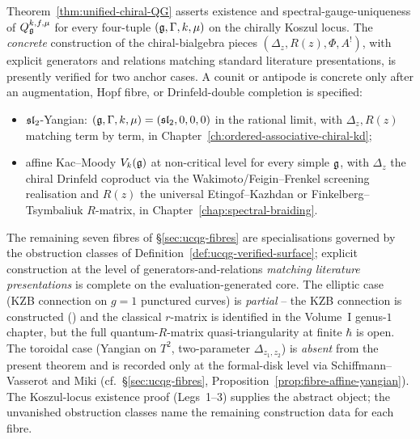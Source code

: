 \begin{remark}
\label{rem:concrete-vs-abstract-scope}
Theorem~\ref{thm:unified-chiral-QG} asserts existence and
spectral-gauge-uniqueness of $Q_{\mathfrak{g}}^{k,f,\mu}$ for every
four-tuple $(\mathfrak{g},\Gamma,k,\mu)$ on the chirally Koszul locus. The
\emph{concrete} construction of the chiral-bialgebra pieces
$(\Delta_z, R(z), \Phi, A^{!})$, with explicit generators and
relations matching standard literature presentations, is presently
verified for two anchor cases. A counit or antipode is concrete only
after an augmentation, Hopf fibre, or Drinfeld-double completion is
specified:
\begin{itemize}
\item[(i)] $\mathfrak{sl}_2$-Yangian: $(\mathfrak{g},\Gamma,k,\mu) = (\mathfrak{sl}_2, 0, 0, 0)$
 in the rational limit, with $\Delta_z, R(z)$ matching
 \cite{Drinfeld85, Molev07, KhoroshkinTolstoy96} term by term, in
 Chapter~\ref{ch:ordered-associative-chiral-kd};
\item[(ii)] affine Kac--Moody $V_k(\mathfrak{g})$ at non-critical level for
 every simple $\mathfrak{g}$, with $\Delta_z$ the chiral Drinfeld coproduct
 via the Wakimoto/Feigin--Frenkel screening realisation and $R(z)$
 the universal Etingof--Kazhdan or Finkelberg--Tsymbaliuk $R$-matrix,
 in Chapter~\ref{chap:spectral-braiding}.
\end{itemize}
The remaining seven fibres of \S\ref{sec:ucqg-fibres} are
specialisations governed by the obstruction classes of
Definition~\ref{def:ucqg-verified-surface}; explicit construction at
the level of generators-and-relations \emph{matching literature
presentations} is complete on the evaluation-generated core. The
elliptic case (KZB connection on
$g=1$ punctured curves) is \emph{partial} -- the KZB connection is
constructed (\cite{Bernard88, Felder94}) and the classical $r$-matrix
is identified in the Volume~I genus-$1$ chapter, but the full
quantum-$R$-matrix quasi-triangularity at finite $\hbar$ is open. The
toroidal case (Yangian on $T^{2}$, two-parameter $\Delta_{z_1, z_2}$)
is \emph{absent} from the present theorem and is recorded only at the
formal-disk level via Schiffmann--Vasserot \cite{SchiffmannVasserot13}
and Miki \cite{Miki07} (cf.\ \S\ref{sec:ucqg-fibres},
Proposition~\ref{prop:fibre-affine-yangian}). The Koszul-locus
existence proof (Legs~1--3) supplies the abstract object; the
unvanished obstruction classes name the remaining construction data
for each fibre.
\end{remark}

